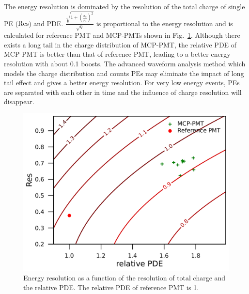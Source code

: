 The energy resolution is dominated by the resolution of the total charge of single PE ($\mathrm{Res}$) and PDE. $\frac{\sqrt{1+(\frac{\sigma_c}{\mu_c})^2}}{\sqrt{\eta}}$ is proportional to the energy resolution and is calculated for reference PMT and MCP-PMTs shown in Fig.~\ref{fig:EnergyResolution}. Although there exists a long tail in the charge distribution of MCP-PMT, the relative PDE of MCP-PMT is better than that of reference PMT, leading to a better energy resolution with about 0.1 boosts. The advanced waveform analysis method which models the charge distribution and counts PEs may eliminate the impact of long tail effect and gives a better energy resolution. For very low energy events, PEs are separated with each other in time and the influence of charge resolution will disappear.
\begin{figure}[!htbp]
    \centering
    \includegraphics[width=\MF\textwidth]{figures/result/resolution.pdf}
    \caption{Energy resolution as a function of the resolution of total charge and the relative PDE. The relative PDE of reference PMT is 1.}
    \label{fig:EnergyResolution}
\end{figure}
